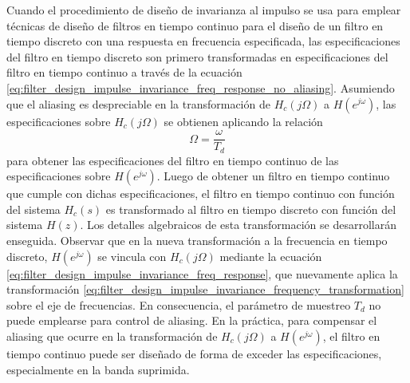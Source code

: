 \documentclass[a4paper]{report}
\begin{document}
Cuando el procedimiento de diseño de invarianza al impulso se usa para emplear técnicas de diseño de filtros en tiempo continuo para el diseño de un filtro en tiempo discreto con una respuesta en frecuencia especificada, las especificaciones del filtro en tiempo discreto son primero transformadas en especificaciones del filtro en tiempo continuo a través de la ecuación \ref{eq:filter_design_impulse_invariance_freq_response_no_aliasing}. Asumiendo que el aliasing es despreciable en la transformación de \(H_c(j\Omega)\) a \(H(e^{j\omega})\), las especificaciones sobre \(H_c(j\Omega)\) se obtienen aplicando la relación
\begin{equation}\label{eq:filter_design_impulse_invariance_frequency_transformation}
 \Omega=\frac{\omega}{T_d} 
\end{equation}
para obtener las especificaciones del filtro en tiempo continuo de las especificaciones sobre \(H(e^{j\omega})\). Luego de obtener un filtro en tiempo continuo que cumple con dichas especificaciones, el filtro en tiempo continuo con función del sistema \(H_c(s)\) es transformado al filtro en tiempo discreto con función del sistema \(H(z)\). Los detalles algebraicos de esta transformación se desarrollarán enseguida. Observar que en la nueva transformación a la frecuencia en tiempo discreto, \(H(e^{j\omega})\) se vincula con \(H_c(j\Omega)\) mediante la ecuación \ref{eq:filter_design_impulse_invariance_freq_response}, que nuevamente aplica la transformación \ref{eq:filter_design_impulse_invariance_frequency_transformation} sobre el eje de frecuencias. En consecuencia, el parámetro de muestreo \(T_d\) no puede emplearse para control de aliasing. En la práctica, para compensar el aliasing que ocurre en la transformación de \(H_c(j\Omega)\) a \(H(e^{j\omega})\), el filtro en tiempo continuo puede ser diseñado de forma de exceder las especificaciones, especialmente en la banda suprimida.
\end{document}
